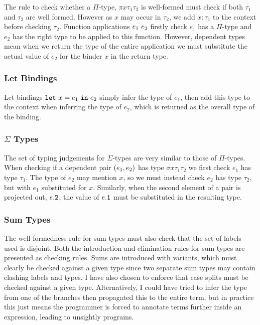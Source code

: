 \documentclass[12pt,a4paper,twoside]{report}
\begin{document}
The rule to check whether a \(\Pi\)-type, \(\pi{x}{\tau_1}{\tau_2}\) is well-formed must check if both \(\tau_1\) and \(\tau_2\) are well formed.
However as \(x\) may occur in \(\tau_2\), we add \(x : \tau_1\) to the context before checking \(\tau_2\).
Function applications \(e_1\ e_2\) firstly check \(e_1\) has a \(\Pi\)-type and \(e_2\) has the right type to be applied to this function.
However, dependent types mean when we return the type of the entire application we must substitute the actual value of \(e_2\) for the binder \(x\) in the return type.

\subsubsection{Let Bindings}

Let bindings \(\mathtt{let}\ x = e_1\ \mathtt{in}\ e_2\) simply infer the type of \(e_1\), then add this type to the context when inferring the type of \(e_2\), which is returned as the overall type of the binding.

\subsubsection{\(\Sigma\) Types}

The set of typing judgements for \(\Sigma\)-types are very similar to those of \(\Pi\)-types.
When checking if a dependent pair \((e_1, e_2)\) has type \(\sigma{x}{\tau_1}{\tau_2}\) we first check \(e_1\) has type \(\tau_1\).
The type of \(e_2\) may mention \(x\), so we must instead check \(e_2\) has type \(\tau_2\), but with \(e_1\) substituted for \(x\).
Similarly, when the second element of a pair is projected out, \(e\mathtt{.2}\), the value of \(e\mathtt{.1}\) must be substituted in the resulting type.

\subsubsection{Sum Types}

The well-formedness rule for sum types must also check that the set of labels used is disjoint.
Both the introduction and elimination rules for sum types are presented as checking rules.
Sums are introduced with variants, which must clearly be checked against a given type since two separate sum types may contain clashing labels and types.
I have also chosen to enforce that case splits must be checked against a given type.
Alternatively, I could have tried to infer the type from one of the branches then propagated this to the entire term, but in practice this just means the programmer is forced to annotate terms further inside an expression, leading to unsightly programs.
\end{document}
